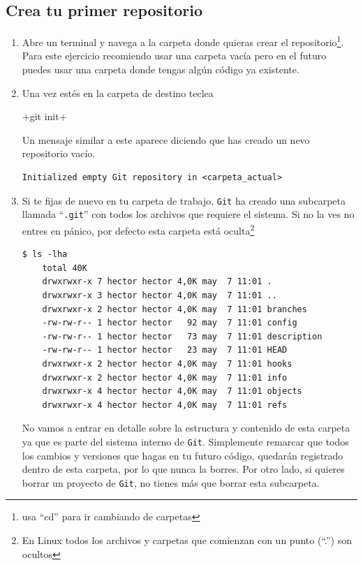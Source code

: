 \documentclass[a5paper,10pt]{article}
\begin{document}
    \subsection{Crea tu primer repositorio}\label{sec:new_repo}
    \begin{enumerate}
      \item Abre un terminal y navega a la carpeta donde quieras crear el repositorio\footnote{usa ``cd'' para ir cambiando de carpetas}. Para este ejercicio recomiendo usar una carpeta vacía pero en el futuro puedes usar una carpeta donde tengas algún código ya existente. 
      
      \item Una vez estés en la carpeta de destino teclea
      
      \cverb+git init+
    
      Un mensaje similar a este aparece diciendo que has creado un nevo repositorio vacío.
      
      \begin{lstlisting}[style=custom]
  Initialized empty Git repository in <carpeta_actual>
      \end{lstlisting}
      
      \item Si te fijas de nuevo en tu carpeta de trabajo, \verb+Git+ ha creado una subcarpeta llamada ``\verb+.git+'' con todos los archivos que requiere el sistema. Si no la ves no entres en pánico, por defecto esta carpeta está oculta\footnote{En Linux todos los archivos y carpetas que comienzan con un punto (``.'') son ocultos}
    
      \begin{lstlisting}[style=custom]
  $ ls -lha
    total 40K
    drwxrwxr-x 7 hector hector 4,0K may  7 11:01 .
    drwxrwxr-x 3 hector hector 4,0K may  7 11:01 ..
    drwxrwxr-x 2 hector hector 4,0K may  7 11:01 branches
    -rw-rw-r-- 1 hector hector   92 may  7 11:01 config
    -rw-rw-r-- 1 hector hector   73 may  7 11:01 description
    -rw-rw-r-- 1 hector hector   23 may  7 11:01 HEAD
    drwxrwxr-x 2 hector hector 4,0K may  7 11:01 hooks
    drwxrwxr-x 2 hector hector 4,0K may  7 11:01 info
    drwxrwxr-x 4 hector hector 4,0K may  7 11:01 objects
    drwxrwxr-x 4 hector hector 4,0K may  7 11:01 refs
      \end{lstlisting}
    
      No vamos a entrar en detalle sobre la estructura y contenido de esta carpeta ya que es parte del sistema interno de \verb+Git+. Simplemente remarcar que todos los cambios y versiones que hagas en tu futuro código, quedarán registrado dentro de esta carpeta, por lo que nunca la borres. Por otro lado, si quieres borrar un proyecto de \verb+Git+, no tienes más que borrar esta subcarpeta.
    

\end{enumerate}
\end{document}
